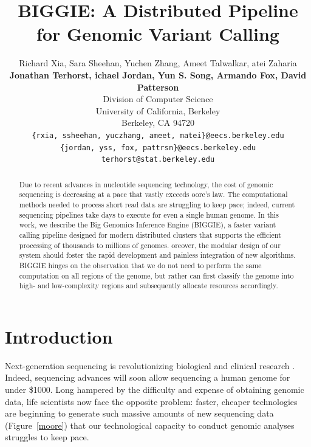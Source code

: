 \documentclass[10pt]{article}
\begin{document}
\title{BIGGIE: A Distributed Pipeline for Genomic Variant Calling}
\author{
Richard Xia, Sara Sheehan, Yuchen Zhang, Ameet Talwalkar, atei Zaharia \\
\textbf{Jonathan Terhorst, ichael Jordan, Yun S. Song, Armando Fox, David Patterson} \\
Division of Computer Science\\
University of California, Berkeley\\
Berkeley, CA 94720 \\
\texttt{\{rxia, ssheehan, yuczhang, ameet, matei\}@eecs.berkeley.edu} \\
\texttt{\{jordan, yss, fox, pattrsn\}@eecs.berkeley.edu} \\
\texttt{terhorst@stat.berkeley.edu}
}
\maketitle

\begin{abstract}
Due to recent advances in nucleotide sequencing technology, the cost of genomic
sequencing is decreasing at a pace that vastly exceeds oore's law.  The
computational methods needed to process short read data are struggling to keep
pace; indeed, current sequencing pipelines take days to execute for even a
single human genome.  In this work, we describe the Big Genomics Inference
Engine (BIGGIE), a faster variant calling pipeline designed for modern
distributed clusters that supports the efficient processing of thousands to
millions of genomes.  oreover, the modular design of our system should foster
the rapid development and painless integration of new algorithms.  BIGGIE
hinges on the observation that we do not need to perform the same computation
on all regions of the genome, but rather can first classify the genome into
high- and low-complexity regions and subsequently allocate resources
accordingly.
\end{abstract}

\twocolumn

\section{Introduction}

Next-generation sequencing is revolutionizing biological and clinical research
\cite{schuster}.  Indeed, sequencing advances will soon allow sequencing a
human genome for under \$1000. Long hampered by the difficulty and
expense of obtaining genomic data, life scientists now face the opposite
problem: faster, cheaper technologies are beginning to generate such massive
amounts of new sequencing data (Figure~\ref{moore}) that our technological
capacity to conduct genomic analyses struggles to keep pace. 
\end{document}
